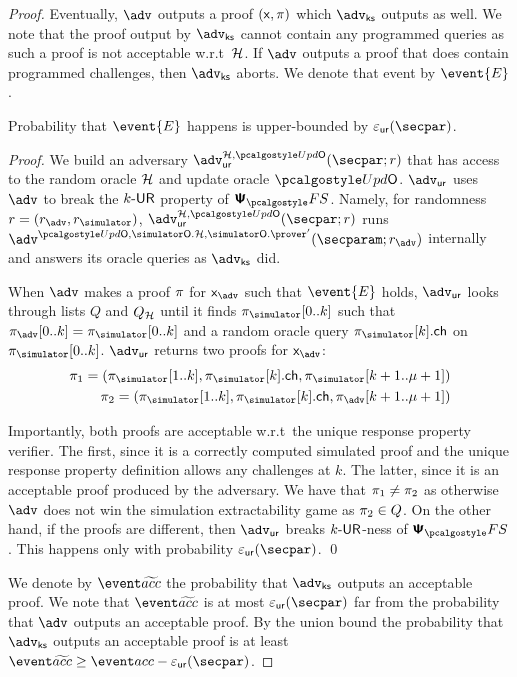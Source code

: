 \begin{proof}
	Eventually, $\advse$ outputs a proof $(\mathsf{x}, \pi)$ which $\advcss$ outputs as well. We note that the proof output by $\advcss$ cannot contain any programmed queries as such a proof is not acceptable w.r.t~$\mathcal{H}$. If $\advse$ outputs a proof that does contain programmed challenges, then $\advcss$ aborts. We denote that event by $\event{E}$.
	
	\begin{lemma}
		Probability that $\event{E}$ happens is upper-bounded by $\epsur(\secpar)$. 
	\end{lemma}
	\begin{proof}
	We build an adversary $\advur^{\ro, \initU} (\secpar; r)$ that has access to the random oracle $\mathcal{H}$ and update oracle $\initU$. $\advur$ uses $\advse$ to break the ${k\text{-}\mathsf{UR}}$ property of $\psfs$. Namely, for randomness $r = (r_{\advse}, \rsim)$, $\advur^{\ro, \initU} (\secpar; r)$ runs $\advse^{\initU, \simOH, \simOP'}(\secparam; r_{\advse})$ internally and answers its oracle queries as $\advcss$ did.

	When $\advse$ makes a proof $\pi$ for $\inp_{\advse}$ such that $\event{E}$ holds, $\advur$ looks through lists $Q$ and $Q_{\mathcal{H}}$ until it finds $\zkproofs[0..k]$ such that $\zkproof_{\advse}[0..k] = \zkproofs[0..k]$ and a random oracle query $\zkproofs[k].\ch$ on $\zkproofs[0..k]$.	$\advur$ returns two proofs for $\inp_{\advse}$:
		\begin{align*}
		\zkproof_1 = (\zkproofs[1..k],
		\zkproofs[k].\ch, \zkproofs[k + 1..\mu + 1])\\
		\zkproof_2 = (\zkproofs[1..k],
		\zkproofs[k].\ch, \zkproof_{\advse}[k + 1..\mu + 1])
		\end{align*}

	Importantly, both proofs are acceptable w.r.t~the unique response property verifier. The first, since it is a correctly computed simulated proof and the unique response property definition allows any challenges at $k$. The latter, since it is an acceptable proof produced by the adversary.
	We have that $\pi_1 \neq \pi_2$ as otherwise $\advse$ does not win the simulation extractability game as $\pi_2 \in Q$. On the other hand, if the proofs are different, then $\advur$ breaks ${k\text{-}\mathsf{UR}}$-ness of $\psfs$. This happens only with  probability $\epsur(\secpar)$. 
	\qed
	\end{proof}

	We denote by $\waccProb$ the probability that $\advcss$ outputs an acceptable proof. We note that $\waccProb$ is at most $\epsur (\secpar)$ far from the probability that $\advse$ outputs an acceptable proof. By the union bound the probability that $\advcss$ outputs an acceptable proof is at least $\waccProb \geq \accProb - \epsur (\secpar)$. 


\end{proof}
